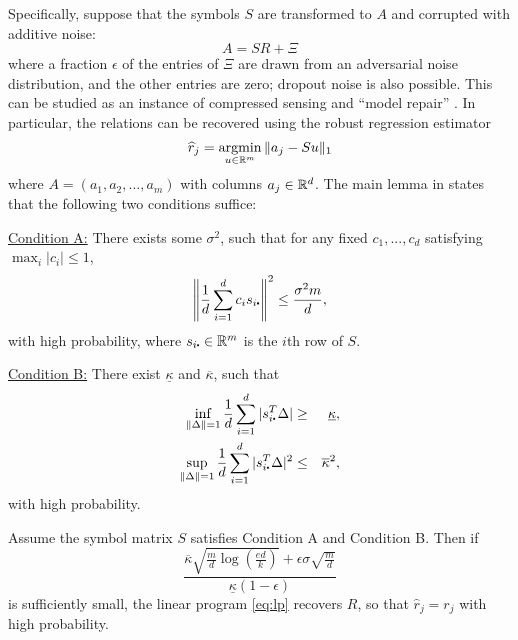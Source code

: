 Specifically, suppose that the symbols \(S\) are transformed to \(A\) and corrupted with additive noise:
\begin{equation}
  A = SR + \Xi
\end{equation}
where a fraction \(\epsilon\) of the entries of \(\Xi\) are drawn from an adversarial noise distribution, and the other entries are zero; dropout noise is also possible.
This can be studied as an instance of compressed sensing and ``model repair'' \citep{candes_randall,model_repair}.  In particular, the relations can be recovered using the  robust regression estimator
\begin{equation}
  \hat r_j = \argmin_{u \in\reals^m} \| a_j - S u\|_1 \label{eq:lp}
\end{equation}
where \(A = (a_1,a_2,\ldots, a_m)\) with columns \(a_j\in\mathbb{R}^d\).
The main lemma in \cite{model_repair} states that the following two conditions suffice:

\underline{Condition A:}
  There exists some \(\sigma^2\), such that for any fixed \(c_1,...,c_d\) satisfying \(\max_i|c_i|\leq 1\),
  \begin{equation}
    \left\|\frac{1}{d}\sum_{i=1}^d c_i s_{i\rdot} \right\|^2\leq \frac{\sigma^2 m}{d},
  \end{equation}
with high probability, where \(s_{i\rdot}\in\reals^m\) is the \(i\)th row of \(S\).

\underline{Condition B:}
  There exist \(\underline{\kappa}\) and \(\overline{\kappa}\), such that
  \begin{eqnarray}
  \label{eq:l1-upper-A} \inf_{\|\Delta\|=1}\frac{1}{d}\sum_{i=1}^d|s_{i\rdot}^T\Delta| &\geq& \underline{\kappa}, \\
  \label{eq:l2-upper-A} \sup_{\|\Delta\|=1}\frac{1}{d}\sum_{i=1}^d|s_{i\rdot}^T\Delta|^2 &\leq& \overline{\kappa}^2,
  \end{eqnarray}
  with high probability.

\begin{thm}\label{thm:main-improved}
  Assume the symbol matrix \(S\) satisfies Condition A and Condition B. Then if
  \begin{equation}
  \frac{\overline{\kappa}\sqrt{\frac{m}{d}\log\left(\frac{e d}{k}\right)}+\epsilon\sigma\sqrt{\frac{m}{d}}}{\underline{\kappa}(1-\epsilon)}
  \end{equation}
  is sufficiently small, the linear program \eqref{eq:lp} recovers \(R\), so that \(\hat r_j = r_j\) with high probability.
  \end{thm}

